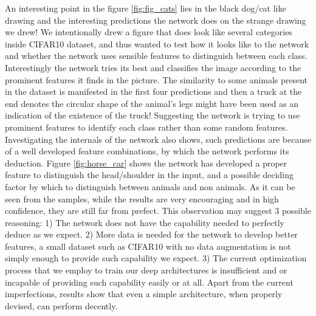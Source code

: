 \documentclass{article} \usepackage{lets_keepit_simple,times}
\begin{document}
An interesting point in the figure \ref{fig:fig_cats} lies in the black dog/cat like drawing and the interesting predictions the network does on the strange drawing we drew! We intentionally drew a figure that does look like several categories inside CIFAR10 dataset, and thus wanted to test how it looks like to the network and whether the network uses sensible features to distinguish between each class. Interestingly the network tries its best and classifies the image according to the prominent features it finds in the picture. The similarity to some animals present in the dataset is manifested in the first four predictions and then a truck at the end denotes the circular shape of the animal's legs might have been used as an indication of the existence of the truck! Suggesting the network is trying to use prominent features to identify each class rather than some random features. Investigating the internals of the network also shows, such predictions are because of a well developed feature combinations, by which the network performs its deduction. Figure \ref{fig:horse_car} shows the network has developed a proper feature to distinguish the head/shoulder in the input, and a possible deciding factor by which to distinguish between animals and non animals. As it can be seen from the samples, while the results are very encouraging and in high confidence, they are still far from prefect. This observation may suggest 3 possible reasoning: 1) The network does not have the capability needed to perfectly deduce as we expect. 2) More data is needed for the network to develop better features, a small dataset such as CIFAR10 with no data augmentation is not simply enough to provide such capability we expect. 3) The current optimization process that we employ to train our deep architectures is insufficient and or incapable of providing such capability easily or at all. Apart from the current imperfections, results show that even a simple architecture, when properly devised, can perform decently.        
\end{document}
